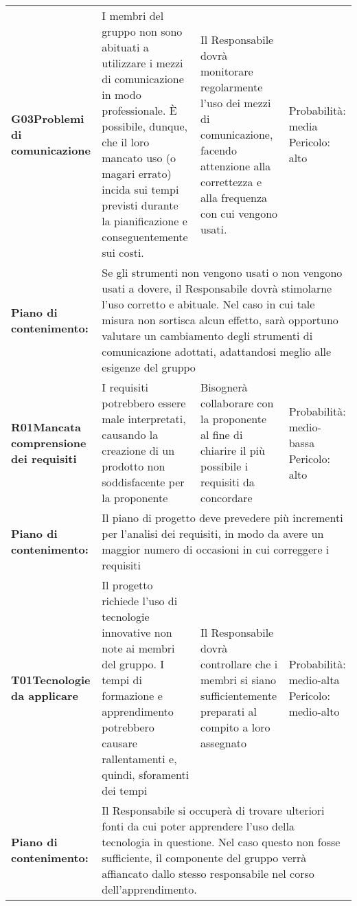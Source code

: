 \begin{longtable}{>{\bfseries}p{2.5cm} p{4.5cm} p{4.5cm} p{2.5cm}}
		\hline
		G03\newline Problemi di comunicazione
		&	I membri del gruppo non sono abituati a utilizzare i mezzi di comunicazione in modo professionale. \`E possibile, dunque, che il loro mancato uso (o magari errato) incida sui tempi previsti durante la pianificazione e conseguentemente sui costi. 
		& Il Responsabile dovrà monitorare regolarmente l'uso dei mezzi di comunicazione, facendo attenzione alla correttezza e alla frequenza con cui vengono usati.
		& Probabilità: media \newline Pericolo: alto \\
		\rowcolor{LightGray}
		Piano di contenimento: 
		& \multicolumn{3}{p{12.5cm}}{Se gli strumenti non vengono usati o non vengono usati a dovere, il Responsabile dovrà stimolarne l'uso corretto e abituale. Nel caso in cui tale misura non sortisca alcun effetto, sarà opportuno valutare un cambiamento degli strumenti di comunicazione adottati, adattandosi meglio alle esigenze del gruppo}\\[0.5cm]

		\hline
		R01\newline Mancata comprensione dei requisiti 
		& I requisiti potrebbero essere male interpretati, causando la creazione di un prodotto non soddisfacente per la proponente
		& Bisognerà collaborare con la proponente al fine di chiarire il più possibile i requisiti da concordare &
		  Probabilità: medio-bassa \newline Pericolo: alto \\
		\rowcolor{LightGray}
		Piano di contenimento: 
		& \multicolumn{3}{p{12.5cm}}{Il piano di progetto deve prevedere più incrementi per l'analisi dei requisiti, in modo da avere un maggior numero di occasioni in cui correggere i requisiti}\\[0.5cm]

		\hline
		T01\newline Tecnologie da applicare
		& Il progetto richiede l'uso di tecnologie innovative non note ai membri del gruppo. I tempi di formazione e apprendimento potrebbero causare rallentamenti e, quindi, sforamenti dei tempi 
		& Il Responsabile dovrà controllare che i membri si siano sufficientemente preparati al compito a loro assegnato 
		& Probabilità: medio-alta \newline Pericolo: medio-alto \\
		\rowcolor{LightGray}
		Piano di contenimento: 
		& \multicolumn{3}{p{12.5cm}}{Il Responsabile si occuperà di trovare ulteriori fonti da cui poter apprendere l'uso della tecnologia in questione. Nel caso questo non fosse sufficiente, il componente del gruppo verrà affiancato dallo stesso responsabile nel corso dell'apprendimento.}\\[0.5cm]


\end{longtable}
